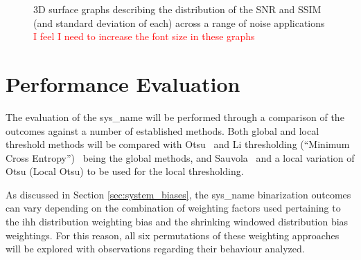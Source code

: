 \begin{figure}[h!]
    \centering
    \caption[3D surface graphs describing the distribution of the SNR and SSIM (and standard deviation of each) across a range of noise applications]{3D surface graphs describing the distribution of the SNR and SSIM (and standard deviation of each) across a range of noise applications \textcolor{red}{I feel I need to increase the font size in these graphs}}
    \label{fig:noise_application_comparison}
\end{figure}

\section{Performance Evaluation}
The evaluation of the \gls{sys_name} will be performed through a comparison of the outcomes against a number of established methods. Both global and local threshold methods will be compared with Otsu~\cite{Otsu1979ATS} and Li thresholding (``Minimum Cross Entropy'')~\cite{Li_thresh} being the global methods, and Sauvola~\cite{adapt_sauvola} and a local variation of Otsu (Local Otsu) to be used for the local thresholding.\par As discussed in Section \ref{sec:system_biases}, the \gls{sys_name} binarization outcomes can vary depending on the combination of weighting factors used pertaining to the \gls{ihh} distribution weighting bias and the shrinking windowed distribution bias weightings. For this reason, all six permutations of these weighting approaches will be explored with observations regarding their behaviour analyzed.

